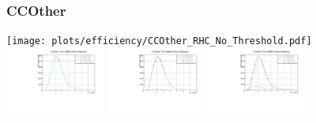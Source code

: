 \subsubsection{CCOther}

\begin{center}

\texttt{[image: plots/efficiency/CCOther\_RHC\_No\_Threshold.pdf]}
\includegraphics[width=0.245\textwidth]{plots/efficiency/CCOther_RHC_10MeV.pdf} 
\includegraphics[width=0.245\textwidth]{plots/efficiency/CCOther_RHC_20MeV.pdf}
\includegraphics[width=0.245\textwidth]{plots/efficiency/CCOther_RHC_50MeV.pdf}

\end{center}
